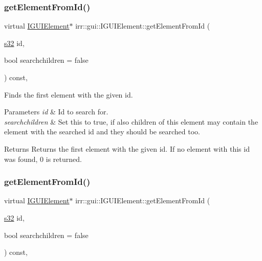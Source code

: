 \subsubsection{\texorpdfstring{get\+Element\+From\+Id()}{getElementFromId()}\hspace{0.1cm}{\footnotesize\ttfamily [1/2]}}
{\footnotesize\ttfamily virtual \hyperlink{classirr_1_1gui_1_1IGUIElement}{I\+G\+U\+I\+Element}$\ast$ irr\+::gui\+::\+I\+G\+U\+I\+Element\+::get\+Element\+From\+Id (\begin{DoxyParamCaption}\item[{\hyperlink{namespaceirr_ac66849b7a6ed16e30ebede579f9b47c6}{s32}}]{id,  }\item[{bool}]{searchchildren = {\ttfamily false} }\end{DoxyParamCaption}) const\hspace{0.3cm}{\ttfamily [inline]}, {\ttfamily [virtual]}}



Finds the first element with the given id. 


\begin{DoxyParams}{Parameters}
{\em id} & Id to search for. \\
\hline
{\em searchchildren} & Set this to true, if also children of this element may contain the element with the searched id and they should be searched too. \\
\hline
\end{DoxyParams}
\begin{DoxyReturn}{Returns}
Returns the first element with the given id. If no element with this id was found, 0 is returned. 
\end{DoxyReturn}
\mbox{\label{classirr_1_1gui_1_1IGUIElement_ab79b8e81d2f2864312345cffe9237cce}} 
\subsubsection{\texorpdfstring{get\+Element\+From\+Id()}{getElementFromId()}\hspace{0.1cm}{\footnotesize\ttfamily [2/2]}}
{\footnotesize\ttfamily virtual \hyperlink{classirr_1_1gui_1_1IGUIElement}{I\+G\+U\+I\+Element}$\ast$ irr\+::gui\+::\+I\+G\+U\+I\+Element\+::get\+Element\+From\+Id (\begin{DoxyParamCaption}\item[{\hyperlink{namespaceirr_ac66849b7a6ed16e30ebede579f9b47c6}{s32}}]{id,  }\item[{bool}]{searchchildren = {\ttfamily false} }\end{DoxyParamCaption}) const\hspace{0.3cm}{\ttfamily [inline]}, {\ttfamily [virtual]}}



